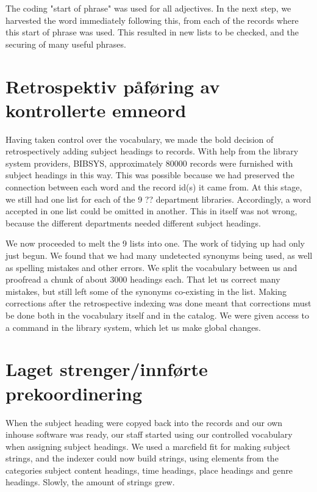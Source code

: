 The coding "start of phrase" was used for all adjectives. In the next step, we harvested the word immediately following this, from each of the records where this start of phrase was used. This resulted in new lists to be checked, and the securing of many useful phrases. 

\section{Retrospektiv påføring av kontrollerte emneord}

Having taken control over the vocabulary, we made the bold decision of retrospectively adding subject headings to records. With help from the library system providers, BIBSYS, approximately 80000 records were furnished with subject headings in this way. This was possible because we had preserved the connection between each word and the record id(s) it came from. At this stage, we still had one list for each of the 9 ?? department libraries. Accordingly, a word accepted in one list could be omitted in another. This in itself was not wrong, because the different departments needed different subject headings. 

We now proceeded to melt the 9 lists into one. The work of tidying up had only just begun. We found that we had many undetected synonyms being used, as well as spelling mistakes and other errors. We split the vocabulary between us and proofread a chunk of about 3000 headings each. That let us correct many mistakes, but still left some of the synonyms co-existing in the list. Making corrections after the retrospective indexing was done meant that corrections must be done both in the vocabulary itself and in the catalog. We were given access to a command in the library system, which let us make global changes. 

\section{Laget strenger/innførte prekoordinering}

When the subject heading were copyed back into the records and our own inhouse software was ready, our staff started using our controlled vocabulary when assigning subject headings. We used a marcfield fit for making subject strings, and the indexer could now build strings, using elements from the categories subject content headings, time headings, place headings and genre headings. Slowly, the amount of strings grew. 

